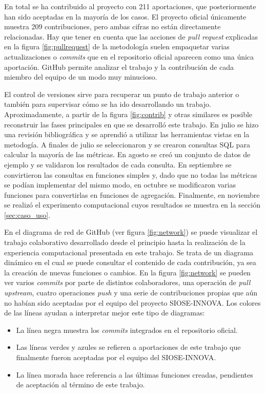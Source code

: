 En total se ha contribuido al proyecto con 211 aportaciones, que posteriormente han sido aceptadas en la mayoría de los casos. El proyecto oficial únicamente muestra 209 contribuciones, pero ambas cifras no están directamente relacionadas. Hay que tener en cuenta que las acciones de \textit{pull request} explicadas en la figura \ref{fig:pullrequest} de la metodología suelen empaquetar varias actualizaciones o \textit{commits} que en el repositorio oficial aparecen como una única aportación. GitHub permite analizar el trabajo y la contribución de cada miembro del equipo de un modo muy minucioso.

El control de versiones sirve para recuperar un punto de trabajo anterior o también para supervisar cómo se ha ido desarrollando un trabajo. Aproximadamente, a partir de la figura \ref{fig:contrib} y otras similares es posible reconstruir las fases principales en que se desarrolló este trabajo. En julio se hizo una revisión bibliográfica y se aprendió a utilizar las herramientas vistas en la metodogía. A finales de julio se seleccionaron y se crearon consultas SQL para calcular la mayoría de las métricas. En agosto se creó un conjunto de datos de ejemplo y se validaron los resultados de cada consulta. En septiembre se convirtieron las consultas en funciones simples y, dado que no todas las métricas se podían implementar del mismo modo, en octubre se modificaron varias funciones para convertirlas en funciones de agregación. Finalmente, en noviembre se realizó el experimento computacional cuyos resultados se muestra en la sección \ref{sec:caso_uso}.

En el diagrama de red de GitHub (ver figura \ref{fig:network}) se puede visualizar el trabajo colaborativo desarrollado desde el principio hasta la realización de la experiencia computacional presentada en este trabajo. Se trata de un diagrama dinámico en el cual se puede consultar el contenido de cada contribución, ya sea la creación de nuevas funciones o cambios. En la figura \ref{fig:network} se pueden ver varios \textit{commits} por parte de distintos colaboradores, una operación de \textit{pull upstream}, cuatro operaciones \textit{push} y una serie de contribuciones propias que aún no habían sido aceptadas por el equipo del proyecto SIOSE-INNOVA. Los colores de las líneas ayudan a interpretar mejor este tipo de diagramas:

\begin{itemize}
\item La línea negra muestra los \textit{commits} integrados en el repositorio oficial.
\item Las líneas verdes y azules se refieren a aportaciones de este trabajo que finalmente fueron aceptadas por el equipo del SIOSE-INNOVA.
\item La línea morada hace referencia a las últimas funciones creadas, pendientes de aceptación al término de este trabajo.
\end{itemize}

